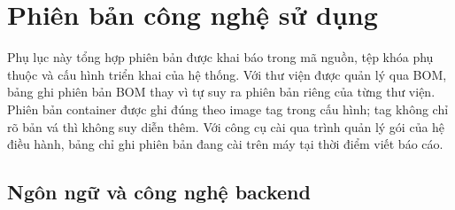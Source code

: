 \documentclass[../BTL.tex]{subfiles}
\begin{document}
\chapter{Phiên bản công nghệ sử dụng}
\label{phu-luc:versions}

Phụ lục này tổng hợp phiên bản được khai báo trong mã nguồn, tệp khóa phụ thuộc và cấu hình triển khai của hệ thống. Với thư viện được quản lý qua BOM, bảng ghi phiên bản BOM thay vì tự suy ra phiên bản riêng của từng thư viện. Phiên bản container được ghi đúng theo image tag trong cấu hình; tag không chỉ rõ bản vá thì không suy diễn thêm. Với công cụ cài qua trình quản lý gói của hệ điều hành, bảng chỉ ghi phiên bản đang cài trên máy tại thời điểm viết báo cáo.

\section{Ngôn ngữ và công nghệ backend}
\end{document}

